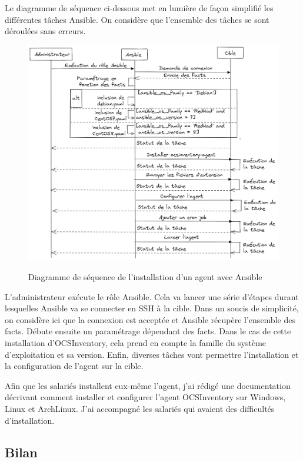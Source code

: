 \documentclass[12pt, a4paper, twoside]{article}
\begin{document}
\newpage
Le diagramme de séquence ci-dessous met en lumière de façon simplifié les différentes tâches \gls{Ansible}. 
On considère que l'ensemble des tâches se sont déroulées sans erreurs.

\begin{figure}[!ht]
    \centering
    \includegraphics[width=\textwidth]{src/graph_ansible_ocs.png}
    \label{fig:ansible_ocs}
    \caption{Diagramme de séquence de l'installation d'un agent avec \gls{Ansible}}
\end{figure}

L'administrateur exécute le rôle \gls{Ansible}.
Cela va lancer une série d'étapes durant lesquelles \gls{Ansible} va se connecter en SSH à la cible.
Dans un soucis de simplicité, on considère ici que la connexion est acceptée et \gls{Ansible} récupère l'ensemble des facts.
Débute ensuite un paramétrage dépendant des facts. 
Dans le cas de cette installation d'\gls{OCSInventory}, cela prend en compte la famille du système d'exploitation et sa version.
Enfin, diverses tâches vont permettre l'installation et la configuration de l'agent sur la cible.

Afin que les salariés installent eux-même l'agent, j'ai rédigé une documentation décrivant comment installer et configurer l'agent \gls{OCSInventory} sur Windows, \gls{Linux} et ArchLinux.
J'ai accompagné les salariés qui avaient des difficultés d'installation.

\subsection{Bilan}
\end{document}
